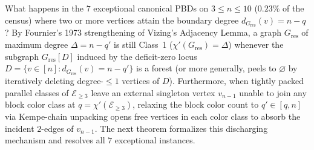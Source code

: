 \documentclass[11pt,reqno]{amsart}
\theoremstyle{definition}
\theoremstyle{remark}
\begin{document}
What happens in the $7$ exceptional canonical PBDs on $3 \le n \le 10$ ($0.23\%$ of the census) where two or more vertices attain the boundary degree $d_{G_{\mathrm{res}}}(v) = n - q$? By Fournier's 1973 strengthening of Vizing's Adjacency Lemma, a graph $G_{\mathrm{res}}$ of maximum degree $\Delta = n - q'$ is still Class~1 ($\chi'(G_{\mathrm{res}}) = \Delta$) whenever the subgraph $G_{\mathrm{res}}[D]$ induced by the deficit-zero locus $D = \{v \in [n] : d_{G_{\mathrm{res}}}(v) = n - q'\}$ is a forest (or more generally, peels to $\varnothing$ by iteratively deleting degree-$\le 1$ vertices of $D$). Furthermore, when tightly packed parallel classes of $\mathcal{E}_{\ge 3}$ leave an external singleton vertex $v_{n-1}$ unable to join any block color class at $q = \chi'(\mathcal{E}_{\ge 3})$, relaxing the block color count to $q' \in [q, n]$ via Kempe-chain unpacking opens free vertices in each color class to absorb the incident $2$-edges of $v_{n-1}$. The next theorem formalizes this discharging mechanism and resolves all $7$ exceptional instances.
\end{document}
